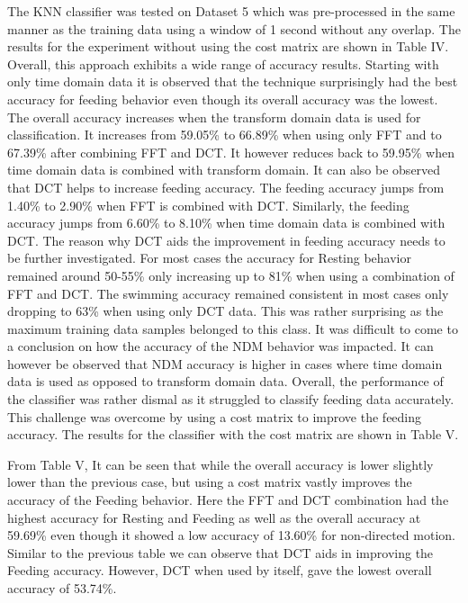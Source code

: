 \documentclass[conference]{IEEEtran}
\begin{document}
The KNN classifier was tested on Dataset 5 which was pre-processed in the same manner as the training data using a window of 1 second without any overlap. The results for the experiment without using the cost matrix are shown in Table IV. Overall, this approach exhibits a wide range of accuracy results. Starting with only time domain data it is observed that the technique surprisingly had the best accuracy for feeding behavior even though its overall accuracy was the lowest. The overall accuracy increases when the transform domain data is used for classification. It increases from 59.05\% to 66.89\% when using only FFT and to 67.39\% after combining FFT and DCT. It however reduces back to 59.95\% when time domain data is combined with transform domain. It can also be observed that DCT helps to increase feeding accuracy. The feeding accuracy jumps from 1.40\% to 2.90\% when FFT is combined with DCT. Similarly, the feeding accuracy jumps from 6.60\% to 8.10\% when time domain data is combined with DCT. The reason why DCT aids the improvement in feeding accuracy needs to be further investigated. For most cases the accuracy for Resting behavior remained around 50-55\% only increasing up to 81\% when using a combination of FFT and DCT. The swimming accuracy remained consistent in most cases only dropping to 63\% when using only DCT data. This was rather surprising as the maximum training data samples belonged to this class. It was difficult to come to a conclusion on how the accuracy of the NDM behavior was impacted. It can however be observed that NDM accuracy is higher in cases where time domain data is used as opposed to transform domain data. Overall, the performance of the classifier was rather dismal as it struggled to classify feeding data accurately. This challenge was overcome by using a cost matrix to improve the feeding accuracy. The results for the classifier with the cost matrix are shown in Table V.


From Table V, It can be seen that while the overall accuracy is lower slightly lower than the previous case, but using a cost matrix vastly improves the accuracy of the Feeding behavior. Here the FFT and DCT combination had the highest accuracy for Resting and Feeding as well as the overall accuracy at 59.69\% even though it showed a low accuracy of 13.60\% for non-directed motion. Similar to the previous table we can observe that DCT aids in improving the Feeding accuracy. However, DCT when used by  itself,  gave the lowest overall accuracy of 53.74\%. 
\end{document}
